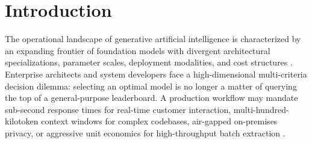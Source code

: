 \documentclass[pdflatex,sn-mathphys-num]{sn-jnl}
\theoremstyle{thmstyleone}
\theoremstyle{thmstylethree}
\begin{document}

\maketitle

\section{Introduction}\label{sec:introduction}

The operational landscape of generative artificial intelligence is characterized by an expanding frontier of foundation models with divergent architectural specializations, parameter scales, deployment modalities, and cost structures \cite{bommasani2021opportunities, kaplan2020scaling}. Enterprise architects and system developers face a high-dimensional multi-criteria decision dilemma: selecting an optimal model is no longer a matter of querying the top of a general-purpose leaderboard. A production workflow may mandate sub-second response times for real-time customer interaction, multi-hundred-kilotoken context windows for complex codebases, air-gapped on-premises privacy, or aggressive unit economics for high-throughput batch extraction \cite{zheng2024judging}.
\end{document}

